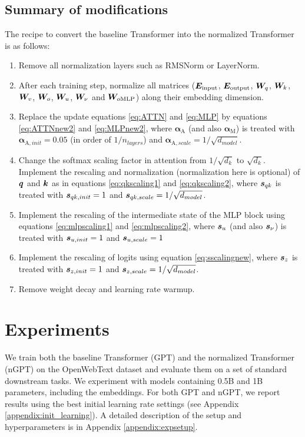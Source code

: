\documentclass{article} %
\begin{document}
\subsection{Summary of modifications}
\label{section_summary}
The recipe to convert the baseline Transformer into the normalized Transformer is as follows: 

\begin{enumerate}
    \item Remove all normalization layers such as RMSNorm or LayerNorm. 
    \item After each training step, normalize all matrices (${\bm{E}}_{\text{input}}$, ${\bm{E}}_{\text{output}}$, ${\bm{W}}_q$, ${\bm{W}}_k$, ${\bm{W}}_v$, ${\bm{W}}_o$, ${\bm{W}}_u$, ${\bm{W}}_\nu$ and ${\bm{W}}_{o\text{MLP}}$) along their embedding dimension. 
    \item Replace the update equations \ref{eq:ATTN} and \ref{eq:MLP} by equations \ref{eq:ATTNnew2} and \ref{eq:MLPnew2}, where $\bm{\alpha}_{\text{A}}$ (and also $\bm{\alpha}_{\text{M}}$) is treated with $\bm{\alpha}_{\text{A},init}=0.05$ (in order of $1/n_{layers}$) and $\bm{\alpha}_{\text{A},scale}=1/\sqrt{d_{model}}$.
    \item Change the softmax scaling factor in attention from $1/\sqrt{d_k}$ to $\sqrt{d_k}$. Implement the rescaling and normalization (normalization here is optional) of ${\bm{q}}$ and ${\bm{k}}$  as in equations \ref{eq:qkscaling1} and \ref{eq:qkscaling2}, where ${\bm{s}}_{qk}$ is treated with ${\bm{s}}_{qk,init}=1$ and ${\bm{s}}_{qk,scale}=1/\sqrt{d_{model}}$. 
    \item Implement the rescaling of the intermediate state of the MLP block using equations \ref{eq:mlpscaling1} and \ref{eq:mlpscaling2}, where ${\bm{s}}_{u}$ (and also ${\bm{s}}_{\nu}$) is treated with ${\bm{s}}_{u,init}=1$ and ${\bm{s}}_{u,scale}=1$
    \item Implement the rescaling of logits using equation \ref{eq:sscalingnew}, where ${\bm{s}}_z$ is treated with ${\bm{s}}_{z,init}=1$ and ${\bm{s}}_{z,scale}=1/\sqrt{d_{model}}$.
    \item Remove weight decay and learning rate warmup. 
\end{enumerate}

\section{Experiments}
\label{section_experiments}
We train both the baseline Transformer (GPT) and the normalized Transformer (nGPT) on the OpenWebText dataset \citep{Gokaslan2019OpenWeb} and evaluate them on a set of standard downstream tasks. We experiment with models containing  0.5B and 1B parameters, including the embeddings. For both GPT and nGPT, we report results using the best initial learning rate settings (see Appendix \ref{appendix:init_learning}). A detailed description of the setup and hyperparameters is in Appendix \ref{appendix:expsetup}.
\end{document}
